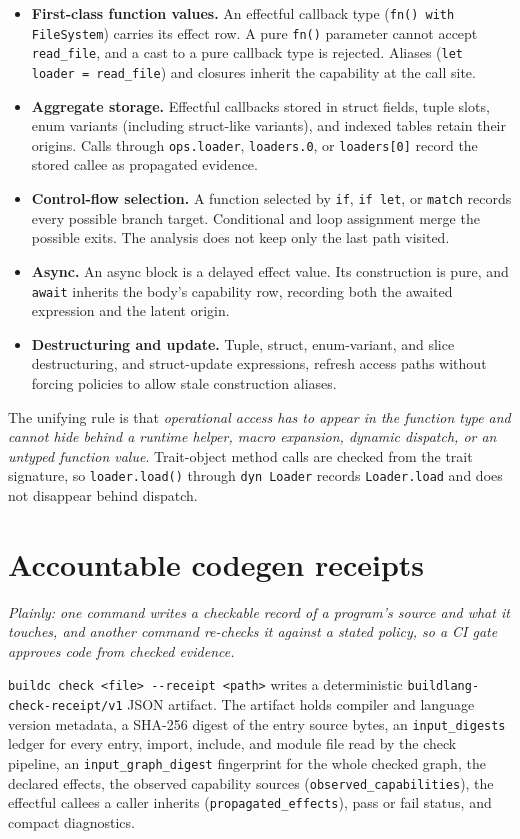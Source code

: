 \documentclass[11pt]{article}
\begin{document}
\begin{itemize}[leftmargin=*,itemsep=1pt]
\item \textbf{First-class function values.} An effectful callback type (\texttt{fn() with FileSystem}) carries its effect row. A pure \texttt{fn()} parameter cannot accept \texttt{read\_file}, and a cast to a pure callback type is rejected. Aliases (\texttt{let loader = read\_file}) and closures inherit the capability at the call site.
\item \textbf{Aggregate storage.} Effectful callbacks stored in struct fields, tuple slots, enum variants (including struct-like variants), and indexed tables retain their origins. Calls through \texttt{ops.loader}, \texttt{loaders.0}, or \texttt{loaders[0]} record the stored callee as propagated evidence.
\item \textbf{Control-flow selection.} A function selected by \texttt{if}, \texttt{if~let}, or \texttt{match} records every possible branch target. Conditional and loop assignment merge the possible exits. The analysis does not keep only the last path visited.
\item \textbf{Async.} An async block is a delayed effect value. Its construction is pure, and \texttt{await} inherits the body's capability row, recording both the awaited expression and the latent origin.
\item \textbf{Destructuring and update.} Tuple, struct, enum-variant, and slice destructuring, and struct-update expressions, refresh access paths without forcing policies to allow stale construction aliases.
\end{itemize}

The unifying rule is that \emph{operational access has to appear in the function type and cannot hide behind a runtime helper, macro expansion, dynamic dispatch, or an untyped function value}. Trait-object method calls are checked from the trait signature, so \texttt{loader.load()} through \texttt{dyn Loader} records \texttt{Loader.load} and does not disappear behind dispatch.

\section{Accountable codegen receipts}
\label{sec:codegen}
\emph{Plainly: one command writes a checkable record of a program's source and what it touches, and another command re-checks it against a stated policy, so a CI gate approves code from checked evidence.}

\texttt{buildc check <file> -{}-receipt <path>} writes a deterministic \texttt{buildlang-check-receipt/v1} JSON artifact. The artifact holds compiler and language version metadata, a SHA-256 digest of the entry source bytes, an \texttt{input\_digests} ledger for every entry, import, include, and module file read by the check pipeline, an \texttt{input\_graph\_digest} fingerprint for the whole checked graph, the declared effects, the observed capability sources (\texttt{observed\_capabilities}), the effectful callees a caller inherits (\texttt{propagated\_effects}), pass or fail status, and compact diagnostics.
\end{document}
